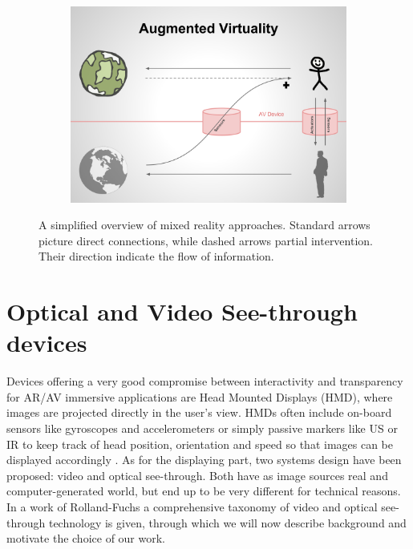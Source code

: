 \begin{figure}[h!]
\begin{subfigure}{0.49\textwidth}
\end{subfigure}
\begin{subfigure}{0.49\textwidth}
\centering
\includegraphics[scale=0.13]{schemas/augmentedvirtuality}
\end{subfigure}
\caption{A simplified overview of mixed reality approaches. Standard arrows picture direct connections, while dashed arrows partial intervention. Their direction indicate the flow of information.}
\label{fig:mixed_reality}
\end{figure}

\newpage

\section{Optical and Video See-through devices} %
Devices offering a very good compromise between interactivity and transparency for AR/AV immersive applications are Head Mounted Displays (HMD), where images are projected directly in the user’s view. HMDs often include on-board sensors like gyroscopes and accelerometers or simply passive markers like US or IR to keep track of head position, orientation and speed so that images can be displayed accordingly \cite{tracking_AR}. As for the displaying part, two systems design have been proposed: video and optical see-through. Both have as image sources real and computer-generated world, but end up to be very different for technical reasons. In a work of Rolland-Fuchs \cite{optical_vs_video_st} a comprehensive taxonomy of video and optical see-through technology is given, through which we will now describe background and motivate the choice of our work.

